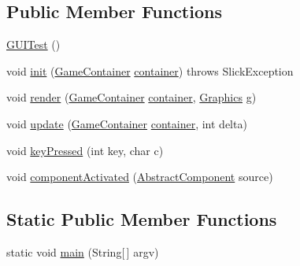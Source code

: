 \subsection*{Public Member Functions}
\begin{DoxyCompactItemize}
\item 
\mbox{\hyperlink{classorg_1_1newdawn_1_1slick_1_1tests_1_1_g_u_i_test_ad2755f50617bf163c40a8db03d7bfe56}{G\+U\+I\+Test}} ()
\item 
void \mbox{\hyperlink{classorg_1_1newdawn_1_1slick_1_1tests_1_1_g_u_i_test_a1cc90a27b484cd4f3a050c71a0695b7e}{init}} (\mbox{\hyperlink{classorg_1_1newdawn_1_1slick_1_1_game_container}{Game\+Container}} \mbox{\hyperlink{classorg_1_1newdawn_1_1slick_1_1tests_1_1_g_u_i_test_a71a14c16d92d7fbb77511e4fc241e8b9}{container}})  throws Slick\+Exception 
\item 
void \mbox{\hyperlink{classorg_1_1newdawn_1_1slick_1_1tests_1_1_g_u_i_test_a0445cdc0c48a9345c36b255fa2b91e08}{render}} (\mbox{\hyperlink{classorg_1_1newdawn_1_1slick_1_1_game_container}{Game\+Container}} \mbox{\hyperlink{classorg_1_1newdawn_1_1slick_1_1tests_1_1_g_u_i_test_a71a14c16d92d7fbb77511e4fc241e8b9}{container}}, \mbox{\hyperlink{classorg_1_1newdawn_1_1slick_1_1_graphics}{Graphics}} g)
\item 
void \mbox{\hyperlink{classorg_1_1newdawn_1_1slick_1_1tests_1_1_g_u_i_test_aad468403d8af3ad670c5a85b0e876dd5}{update}} (\mbox{\hyperlink{classorg_1_1newdawn_1_1slick_1_1_game_container}{Game\+Container}} \mbox{\hyperlink{classorg_1_1newdawn_1_1slick_1_1tests_1_1_g_u_i_test_a71a14c16d92d7fbb77511e4fc241e8b9}{container}}, int delta)
\item 
void \mbox{\hyperlink{classorg_1_1newdawn_1_1slick_1_1tests_1_1_g_u_i_test_a0922e0487eb33ea5669f9a24190cb124}{key\+Pressed}} (int key, char c)
\item 
void \mbox{\hyperlink{classorg_1_1newdawn_1_1slick_1_1tests_1_1_g_u_i_test_ac65a0c55d80072f40460633961158f3e}{component\+Activated}} (\mbox{\hyperlink{classorg_1_1newdawn_1_1slick_1_1gui_1_1_abstract_component}{Abstract\+Component}} source)
\end{DoxyCompactItemize}
\subsection*{Static Public Member Functions}
\begin{DoxyCompactItemize}
\item 
static void \mbox{\hyperlink{classorg_1_1newdawn_1_1slick_1_1tests_1_1_g_u_i_test_a74116b79237f3665a51d29f9fbb21a04}{main}} (String\mbox{[}$\,$\mbox{]} argv)
\end{DoxyCompactItemize}
